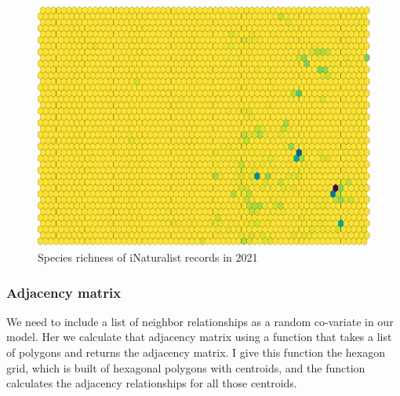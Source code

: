 \documentclass[
]{article}
\newenvironment{Shaded}{\begin{snugshade}}{\end{snugshade}}
\newcommand{\DataTypeTok}[1]{\textcolor[rgb]{0.13,0.29,0.53}{#1}}
\newcommand{\DecValTok}[1]{\textcolor[rgb]{0.00,0.00,0.81}{#1}}
\newcommand{\FloatTok}[1]{\textcolor[rgb]{0.00,0.00,0.81}{#1}}
\newcommand{\KeywordTok}[1]{\textcolor[rgb]{0.13,0.29,0.53}{\textbf{#1}}}
\newcommand{\NormalTok}[1]{#1}
\newcommand{\OperatorTok}[1]{\textcolor[rgb]{0.81,0.36,0.00}{\textbf{#1}}}
\newcommand{\OtherTok}[1]{\textcolor[rgb]{0.56,0.35,0.01}{#1}}
\newcommand{\StringTok}[1]{\textcolor[rgb]{0.31,0.60,0.02}{#1}}
\begin{document}
\begin{figure}
\centering
\includegraphics{Earth_Lab_application_files/figure-latex/unnamed-chunk-9-1.pdf}
\caption{Species richness of iNaturalist records in 2021}
\end{figure}

\hypertarget{adjacency-matrix}{%
\subsubsection{Adjacency matrix}\label{adjacency-matrix}}

We need to include a list of neighbor relationships as a random
co-variate in our model. Her we calculate that adjacency matrix using a
function that takes a list of polygons and returns the adjacency matrix.
I give this function the hexagon grid, which is built of hexagonal
polygons with centroids, and the function calculates the adjacency
relationships for all those centroids.

\begin{Shaded}
\end{Shaded}
\end{document}
